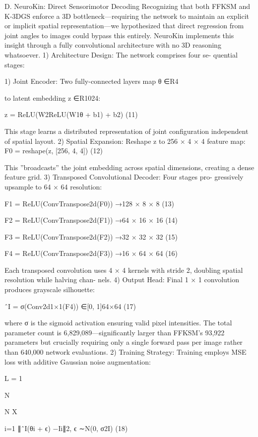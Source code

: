 \documentclass[10pt,twocolumn,letterpaper]{article}
\begin{document}
D. NeuroKin: Direct Sensorimotor Decoding Recognizing that both FFKSM and K-3DGS enforce a 3D bottleneck—requiring the network to maintain an explicit or implicit spatial representation—we hypothesized that direct regression from joint angles to images could bypass this entirely. NeuroKin implements this insight through a fully convolutional architecture with no 3D reasoning whatsoever. 1) Architecture Design: The network comprises four se- quential stages:

1) Joint Encoder: Two fully-connected layers map θ ∈R4

to latent embedding z ∈R1024:

z = ReLU(W2ReLU(W1θ + b1) + b2) (11)

This stage learns a distributed representation of joint configuration independent of spatial layout. 2) Spatial Expansion: Reshape z to 256 × 4 × 4 feature map: F0 = reshape(z, [256, 4, 4]) (12)

This ”broadcasts” the joint embedding across spatial dimensions, creating a dense feature grid. 3) Transposed Convolutional Decoder: Four stages pro- gressively upsample to 64 × 64 resolution:

F1 = ReLU(ConvTranspose2d(F0)) →128 × 8 × 8 (13)

F2 = ReLU(ConvTranspose2d(F1)) →64 × 16 × 16 (14)

F3 = ReLU(ConvTranspose2d(F2)) →32 × 32 × 32 (15)

F4 = ReLU(ConvTranspose2d(F3)) →16 × 64 × 64 (16)

Each transposed convolution uses 4 × 4 kernels with stride 2, doubling spatial resolution while halving chan- nels. 4) Output Head: Final 1 × 1 convolution produces grayscale silhouette:

ˆI = σ(Conv2d1×1(F4)) ∈[0, 1]64×64 (17)

where σ is the sigmoid activation ensuring valid pixel intensities. The total parameter count is 6,829,089—significantly larger than FFKSM’s 93,922 parameters but crucially requiring only a single forward pass per image rather than 640,000 network evaluations. 2) Training Strategy: Training employs MSE loss with additive Gaussian noise augmentation:

L = 1

N

N X

i=1 ∥ˆI(θi + ϵ) −Ii∥2, ϵ ∼N(0, σ2I) (18)
\end{document}
